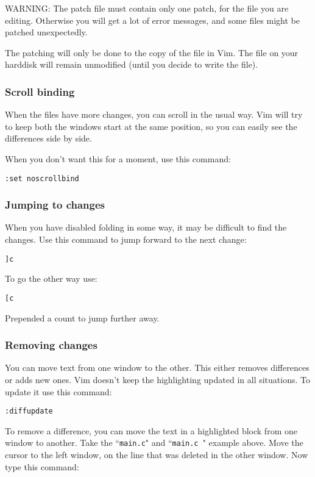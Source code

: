WARNING: The patch file must contain only one patch, for the file you are editing.
Otherwise you will get a lot of error messages, and some files might be patched unexpectedly.

The patching will only be done to the copy of the file in Vim.
The file on your harddisk will remain unmodified (until you decide to write the file).

\subsubsection{Scroll binding}
When the files have more changes, you can scroll in the usual way.
Vim will try to keep both the windows start at the same position, so you can easily see the differences side by side.

When you don't want this for a moment, use this command:

 \begin{Verbatim}[samepage=true]
 :set noscrollbind
 \end{Verbatim}

\subsubsection{Jumping to changes}
When you have disabled folding in some way, it may be difficult to find the changes.
Use this command to jump forward to the next change:

 \begin{Verbatim}[samepage=true]
 ]c
 \end{Verbatim}

To go the other way use:

 \begin{Verbatim}[samepage=true]
 [c
 \end{Verbatim}

Prepended a count to jump further away.
\subsubsection{Removing changes}
You can move text from one window to the other.
This either removes differences or adds new ones.
Vim doesn't keep the highlighting updated in all situations.
To update it use this command:

 \begin{Verbatim}[samepage=true]
 :diffupdate
 \end{Verbatim}

To remove a difference, you can move the text in a highlighted block from one window to another.
Take the ``\texttt{main.c}" and ``\texttt{main.c~}" example above.
Move the cursor to the left window, on the line that was deleted in the other window.
Now type this command:

